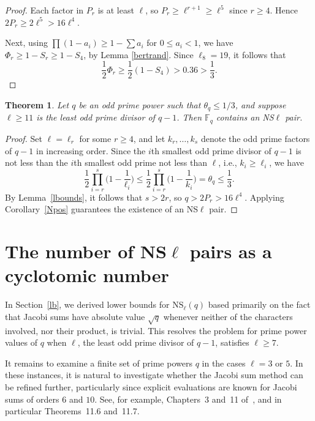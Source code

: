 \documentclass[12pt]{amsart}
\newtheorem{thm}{Theorem}[section]
\numberwithin{equation}{section}
\newcommand{\F}{\mathbb{F}_q}
\begin{document}
\begin{proof}
Each factor in $P_r$ is at least $\ell$, so $P_r \ge \ell^{r+1} \ge \ell^5$ since $r \ge 4$. Hence $2 P_r \ge 2 \ell^5 > 16 \ell^4$.  

Next, using $\prod (1 - a_i) \ge 1 - \sum a_i$ for  $0\le a_i <1$, we have $\Phi_r \ge 1 - S_r \ge 1 - S_4$, by Lemma \ref{bertrand}. Since $\ell_8 = 19$, it follows that
\[
\frac{1}{2} \Phi_r \ge \frac{1}{2}(1 - S_4) > 0.36 > \frac{1}{3}.
\]
\end{proof}

\begin{thm}\label{largeL}
Let $q$ be an odd prime power such that $\theta_q \le 1/3$, and suppose $\ell \ge 11$ is the least odd prime divisor of $q-1$. Then $\F$ contains an  NS$\ell$ pair.
\end{thm}


\begin{proof}
Set $\ell = \ell_r$ for some $r \ge 4$, and let $k_r, \dots, k_s$ denote the odd prime factors of $q-1$ in increasing order.    Since the $i$th smallest odd prime divisor of $q-1$ is not less than the $i$th  smallest odd prime not less than $\ell$, i.e.,  $k_i \ge \ell_i$, we have
\[
\frac{1}{2} \prod_{i=r}^s \Big(1 - \frac{1}{\ell_i}\Big) \le \frac{1}{2} \prod_{i=r}^s \Big(1 - \frac{1}{k_i}\Big) = \theta_q \le \frac{1}{3}.
\]
By Lemma~\ref{lbounds}, it follows that $s > 2r$, so $q > 2 P_r > 16 \ell^4$. Applying Corollary~\ref{Npos} guarantees the existence of an NS$\ell$ pair.
\end{proof}
   
\bigskip

\section{The number of NS$\ell$ pairs as a cyclotomic number}

In Section~\ref{lb}, we derived lower bounds for $\mathrm{NS}_\ell(q)$ based primarily on the fact that Jacobi sums have absolute value $\sqrt{q}$ whenever neither of the characters involved, nor their product, is trivial. This resolves the problem for prime power values of $q$ when $\ell$, the least odd prime divisor of $q-1$, satisfies $\ell \geq 7$. 

It remains to examine a finite set of prime powers $q$ in the cases $\ell = 3$ or $5$. In these instances, it is natural to investigate whether the Jacobi sum method can be refined further, particularly since explicit evaluations are known for Jacobi sums of orders $6$ and $10$. See, for example, Chapters~3 and~11 of~\cite{BEW1998}, and in particular Theorems~11.6 and~11.7.
\end{document}
